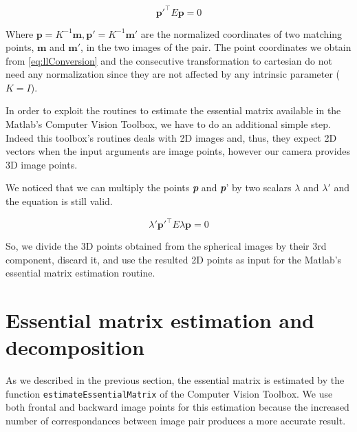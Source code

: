 \begin{equation}
\label{eq:essentialMatrix}
\mathbf{p}'^\top E\mathbf{p} = 0
\end{equation}

Where 
\begin{math}\mathbf{p} = K^{-1} \mathbf{m},
\mathbf{p}' = K^{-1} \mathbf{m}'\end{math} are the normalized coordinates of 
two matching points, \begin{math}\mathbf{m}\end{math} and
\begin{math}\mathbf{m'}\end{math}, in the two images of the pair.
The point coordinates we obtain from \ref{eq:llConversion} and the consecutive 
transformation to cartesian do not need any normalization since they are not 
affected by any intrinsic parameter
(\begin{math}K = I\end{math}).

In order to exploit the routines to estimate the essential matrix available 
in the Matlab's Computer Vision Toolbox, we have to do an additional simple 
step.
Indeed this toolbox's routines deals with 2D images and, thus, they expect 
2D vectors when the input arguments are image points, however our camera
provides 3D image points.

We noticed that we can multiply the points \textbf{\textit{p}}
and \textbf{\textit{p}}' by two 
scalars \begin{math}{\lambda}\end{math} and 
\begin{math}{\lambda}'\end{math} and the equation is still valid.

\begin{equation*}
\lambda'\mathbf{p}'^\top E\lambda\mathbf{p} = 0
\end{equation*}

So, we divide the 3D points obtained from the spherical images by their 
3rd component, discard it, and use the resulted 2D points as input for the 
Matlab's essential matrix estimation routine.

\section{Essential matrix estimation and decomposition}
As we described in the previous section, the essential matrix is estimated 
by the function {\tt estimateEssentialMatrix} of the Computer Vision Toolbox.
We use both frontal and backward image points for this estimation because
the increased number of correspondances between image pair produces 
a more accurate result.

